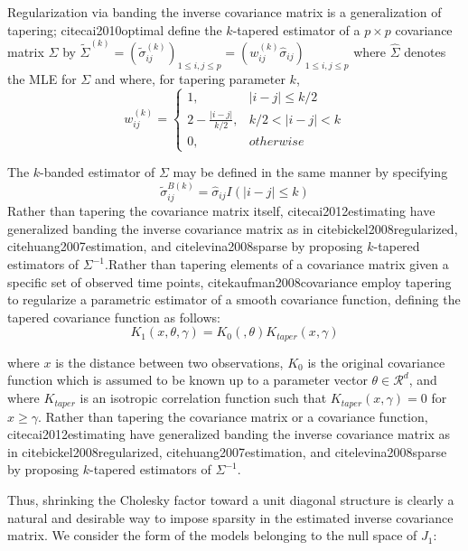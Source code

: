 \documentclass[12pt]{article}
\theoremstyle{definition}
\begin{document}
Regularization via banding the inverse covariance matrix is a generalization of tapering; cite{cai2010optimal} define the $k$-tapered estimator of a $p \times p$ covariance matrix $\Sigma$ by $\tilde{\Sigma}^{\left(k\right)} = \left( \tilde{\sigma}_{ij}^{\left(k\right)} \right)_{1 \le i,j\le p} = \left( w_{ij}^{\left(k\right)}\hat{\sigma}_{ij} \right)_{1 \le i,j\le p}$ where $\hat{\Sigma}$ denotes the MLE for $\Sigma$ and where, for tapering parameter $k$,
\[
w_{ij}^{\left(k\right)} = \left\{ \begin{array}{ll} 1,& \vert i-j \vert \le k/2 \\ 2 - \frac{\vert i-j \vert}{k/2},& k/2 < \vert i-j \vert < k  \\  0, & otherwise    \end{array}\right.
\]

The $k$-banded estimator of $\Sigma$ may be defined in the same manner by specifying 
\[
\tilde{\sigma}_{ij}^{B\left(k\right)} = \hat{\sigma}_{ij}I\left( \vert i-j \vert \le k \right)
\]
Rather than tapering the covariance matrix itself, cite{cai2012estimating} have generalized banding the inverse covariance matrix as in cite{bickel2008regularized}, cite{huang2007estimation}, and cite{levina2008sparse} by proposing $k$-tapered estimators of $\Sigma^{-1}$.Rather than tapering elements of a covariance matrix given a specific set of observed time points, cite{kaufman2008covariance} employ tapering to regularize a parametric estimator of a smooth covariance function, defining the tapered covariance function as follows:
\[
K_1\left(x, \theta, \gamma \right) = K_0\left(,\theta \right) K_{taper}\left( x,\gamma \right) 
\]

where $x$ is the distance between two observations, $K_0$ is the original covariance function which is assumed to be known up to a parameter vector $\theta \in \mathcal{R}^d$, and where $K_{taper}$ is an isotropic correlation function such that $K_{taper}\left(x,\gamma\right) = 0$ for $x \ge \gamma$. Rather than tapering the covariance matrix or a covariance function, cite{cai2012estimating} have generalized banding the inverse covariance matrix as in cite{bickel2008regularized}, cite{huang2007estimation}, and cite{levina2008sparse} by proposing $k$-tapered estimators of $\Sigma^{-1}$.

Thus, shrinking the Cholesky factor toward a unit diagonal structure is clearly a natural and desirable way to impose sparsity in the estimated inverse covariance matrix. We consider the form of the models belonging to the null space of $J_1$:
\end{document}
